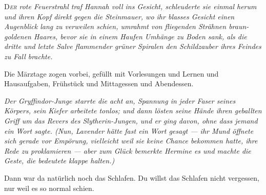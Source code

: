 
\lettrine{D}{\emph{er}} \emph{rote Feuerstrahl traf Hannah voll ins Gesicht, schleuderte sie einmal herum und ihren Kopf direkt gegen die Steinmauer, wo ihr blasses Gesicht einen Augenblick lang zu verweilen schien, umrahmt von fliegenden Strähnen braun-goldenen Haares, bevor sie in einem Haufen Umhänge zu Boden sank, als die dritte und letzte Salve flammender grüner Spiralen den Schildzauber ihres Feindes zu Fall brachte.}

Die Märztage zogen vorbei, gefüllt mit Vorlesungen und Lernen und Hausaufgaben, Frühstück und Mittagessen und Abendessen.

\emph{Der Gryffindor-Junge starrte die acht an, Spannung in jeder Faser seines Körpers, sein Kiefer arbeitete tonlos; und dann lösten seine Hände ihren geballten Griff um das Revers des Slytherin-Jungen, und er ging davon, ohne dass jemand ein Wort sagte. (Nun, Lavender hätte fast ein Wort gesagt — ihr Mund öffnete sich gerade vor Empörung, vielleicht weil sie keine Chance bekommen hatte, ihre Rede zu proklamieren — aber zum Glück bemerkte Hermine es und machte die Geste, die bedeutete \emph{klappe halten}.)}

Dann war da natürlich noch das Schlafen. Du willst das Schlafen nicht vergessen, nur weil es so normal schien.

